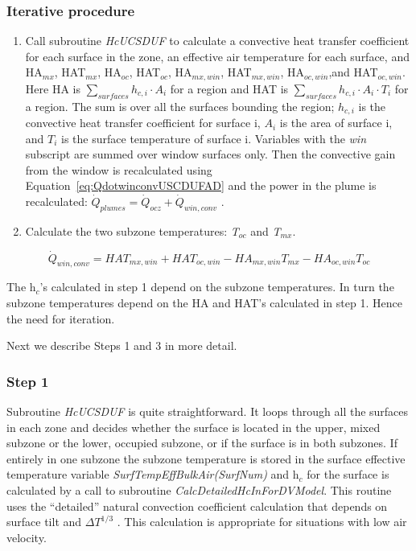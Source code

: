 \subsubsection{Iterative procedure}\label{iterative-procedure-2}

\begin{enumerate}
\item Call subroutine \emph{HcUCSDUF} to calculate a convective heat transfer coefficient for each surface in the zone, an effective air temperature for each surface, and HA\(_{mx}\), HAT\(_{mx}\), HA\(_{oc}\), HAT\(_{oc}\), HA\(_{mx,win}\), HAT\(_{mx,win}\), HA\(_{oc,win}\),and HAT\(_{oc,win}\). Here HA is \(\sum\limits_{surfaces} {{h_{c,i}} \cdot {A_i}}\) for a region and HAT is \(\sum\limits_{surfaces} {{h_{c,i}} \cdot {A_i}} \cdot {T_i}\) for a region. The sum is over all the surfaces bounding the region; \({h_{c,i}}\) is the convective heat transfer coefficient for surface i, \({A_i}\) is the area of surface i, and \({T_i}\) is the surface temperature of surface i. Variables with the \emph{win} subscript are summed over window surfaces only. Then the convective gain from the window is recalculated using Equation~\ref{eq:QdotwinconvUSCDUFAD} and the power in the plume is recalculated: \({\dot Q_{plumes}} = {\dot Q_{ocz}} + {\dot Q_{win,conv}}\) .
\item Calculate the two subzone temperatures: \emph{T\(_{oc}\)} and \emph{T\(_{mx}\)}.
\end{enumerate}

\begin{equation}
{\dot Q_{win,conv}} = HA{T_{mx,win}} + HA{T_{oc,win}} - H{A_{mx,win}}{T_{mx}} - H{A_{oc,win}}{T_{oc}}
\label{eq:QdotwinconvUSCDUFAD}
\end{equation}

The h\(_{c}\)'s calculated in step 1 depend on the subzone temperatures. In turn the subzone temperatures depend on the HA and HAT's calculated in step 1. Hence the need for iteration.

Next we describe Steps 1 and 3 in more detail.

\subsubsection{Step 1}\label{step-1-2}

Subroutine \emph{HcUCSDUF} is quite straightforward. It loops through all the surfaces in each zone and decides whether the surface is located in the upper, mixed subzone or the lower, occupied subzone, or if the surface is in both subzones. If entirely in one subzone the subzone temperature is stored in the surface effective temperature variable \emph{SurfTempEffBulkAir(SurfNum)} and h\(_{c}\) for the surface is calculated by a call to subroutine \emph{CalcDetailedHcInForDVModel}. This routine uses the ``detailed'' natural convection coefficient calculation that depends on surface tilt and \(\Delta {T^{1/3}}\) . This calculation is appropriate for situations with low air velocity.

